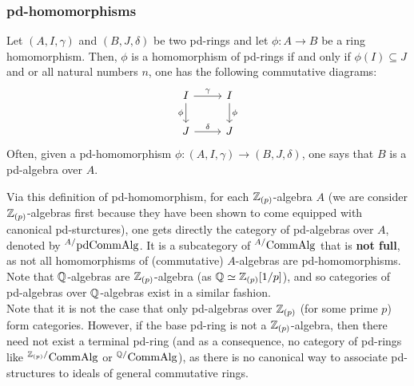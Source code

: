             \subsubsection{pd-homomorphisms}
                \begin{definition}[pd-homomorphisms] \label{def: pd_homomorphisms}
                    Let $(A, I , \gamma)$ and $(B, J, \delta)$ be two pd-rings and let $\phi: A \to B$ be a ring homomorphism. Then, $\phi$ is a homomorphism of pd-rings if and only if $\phi(I) \subseteq J$ and or all natural numbers $n$, one has the following commutative diagrams:
                        $$
                            \begin{tikzcd}
                            	{I} & {I} \\
                            	{J} & {J}
                            	\arrow["{\phi}"', from=1-1, to=2-1]
                            	\arrow["{\phi}", from=1-2, to=2-2]
                            	\arrow["{\delta}", from=2-1, to=2-2]
                            	\arrow["{\gamma}", from=1-1, to=1-2]
                            \end{tikzcd}
                        $$
                    Often, given a pd-homomorphism $\phi: (A, I, \gamma) \to (B, J, \delta)$, one says that $B$ is a pd-algebra over $A$. 
                \end{definition}
                \begin{remark}
                    Via this definition of pd-homomorphism, for each $\mathbb{Z}_{(p)}$-algebra $A$ (we are consider $\mathbb{Z}_{(p)}$-algebras first because they have been shown to come equipped with canonical pd-sturctures), one gets directly the category of pd-algebras over $A$, denoted by ${}^{A/}\mathrm{pd}\mathrm{Comm}\mathrm{Alg}$. It is a subcategory of ${}^{A/}\mathrm{Comm}\mathrm{Alg}$ that is \textbf{not full}, as not all homomorphisms of (commutative) $A$-algebras are pd-homomorphisms. Note that $\mathbb{Q}$-algebras are $\mathbb{Z}_{(p)}$-algebra (as $\mathbb{Q} \simeq \mathbb{Z}_{(p)}[1/p]$), and so categories of pd-algebras over $\mathbb{Q}$-algebras exist in a similar fashion.
                    \\
                    Note that it is not the case that only pd-algebras over $\mathbb{Z}_{(p)}$ (for some prime $p$) form categories. However, if the base pd-ring is not a $\mathbb{Z}_{(p)}$-algebra, then there need not exist a terminal pd-ring (and as a consequence, no  category of pd-rings like ${}^{\mathbb{Z}_{(p)}/}\mathrm{Comm}\mathrm{Alg}$ or ${}^{\mathbb{Q}/}\mathrm{Comm}\mathrm{Alg}$), as there is no canonical way to associate pd-structures to ideals of general commutative rings.  
                \end{remark}
                
